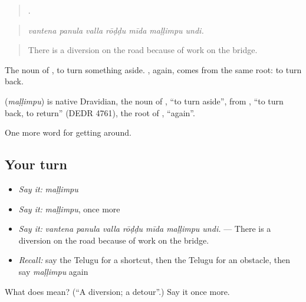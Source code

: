 \begin{quote}
      .
\end{quote}

\begin{quote}
\emph{vantena panula valla rōḍḍu mīda maḷḷimpu undi.}
\end{quote}

\begin{quote}
There is a diversion on the road because of work on the bridge.
\end{quote}

The noun of , to turn something aside. , again, comes from the same root: to turn back.

\begin{cousinweb}
\textbf{} (\emph{maḷḷimpu}) is native Dravidian, the noun of , \textquotedblleft{}to turn aside\textquotedblright{}, from , \textquotedblleft{}to turn back, to return\textquotedblright{} (DEDR 4761), the root of , \textquotedblleft{}again\textquotedblright{}.
\end{cousinweb}

\begin{grammarlens}[title={What you've built}]
One more word for getting around.
\end{grammarlens}

\subsection*{Your turn}
\begin{itemize}
\raggedright
  \item \emph{Say it:} \emph{maḷḷimpu}
  \item \emph{Say it:} \emph{maḷḷimpu}, once more
  \item \emph{Say it:} \emph{vantena panula valla rōḍḍu mīda maḷḷimpu undi.} — There is a diversion on the road because of work on the bridge.
  \item \emph{Recall:} say the Telugu for a shortcut, then the Telugu for an obstacle, then say \emph{maḷḷimpu} again
\end{itemize}

\begin{tcolorbox}[breakable,colback=teal!4,colframe=teal!35!black,title={Before you move on}]
What does  mean? (\textquotedblleft{}A diversion; a detour\textquotedblright{}.) Say it once more.
\end{tcolorbox}

